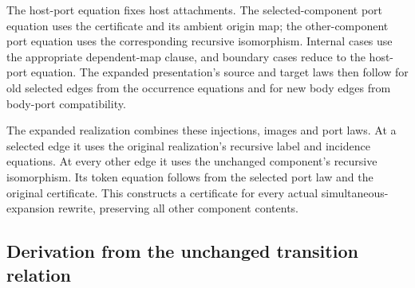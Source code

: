 

The host-port equation fixes host attachments. The selected-component port
equation uses the certificate and its ambient origin map; the other-component
port equation uses the corresponding recursive isomorphism. Internal cases
use the appropriate dependent-map clause, and boundary cases reduce to the
host-port equation. The expanded presentation's source and target laws then
follow for old selected edges from the occurrence equations and for new body
edges from body-port compatibility.






The expanded realization combines these injections, images and port laws.
At a selected edge it uses the original realization's recursive label and
incidence equations. At every other edge it uses the unchanged component's
recursive isomorphism. Its token equation follows from the selected port law
and the original certificate. This constructs a certificate for every actual
simultaneous-expansion rewrite, preserving all other component contents.



\subsection{Derivation from the unchanged transition relation}

